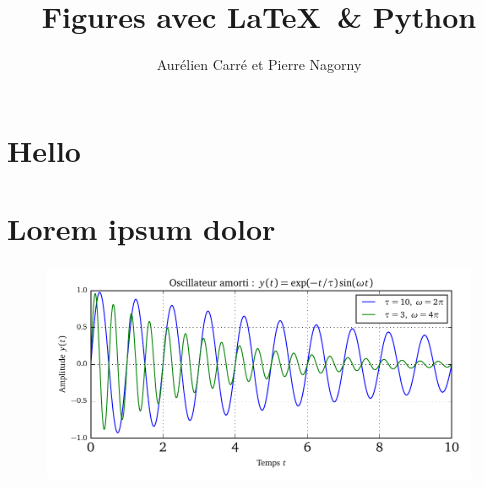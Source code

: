 \documentclass[10pt,a4paper]{article}
\title{Figures avec \LaTeX \ \& Python}
\author{Aurélien Carré et Pierre Nagorny}
\begin{document}
\maketitle

\section{Hello}

\section{Lorem ipsum dolor}

\lipsum[1-13]

\begin{figure}[h]
\begin{center}
\includegraphics{Oscillateur}
\end{center}
\end{figure}

\lipsum[1-13]
\end{document}
